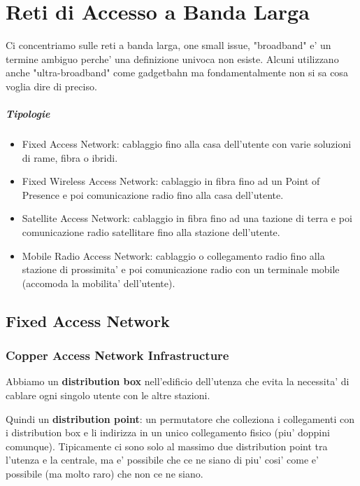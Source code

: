 \chapter{Reti di Accesso a Banda Larga}

Ci concentriamo sulle reti a banda larga, one small issue, "broadband" e' un termine ambiguo perche' una definizione univoca non esiste.
Alcuni utilizzano anche "ultra-broadband" come gadgetbahn ma fondamentalmente non si sa cosa voglia dire di preciso.


\paragraph{Tipologie}

\begin{itemize}
  \item Fixed Access Network: cablaggio fino alla casa dell'utente con varie soluzioni di rame, fibra o ibridi.
  \item Fixed Wireless Access Network: cablaggio in fibra fino ad un Point of Presence e poi comunicazione radio fino alla casa dell'utente.
  \item Satellite Access Network: cablaggio in fibra fino ad una tazione di terra e poi comunicazione radio satellitare fino alla stazione dell'utente.
  \item Mobile Radio Access Network: cablaggio o collegamento radio fino alla stazione di prossimita' e poi comunicazione radio con un terminale mobile (accomoda la mobilita' dell'utente).
\end{itemize}

\section{Fixed Access Network}

\subsection{Copper Access Network Infrastructure}

Abbiamo un \textbf{distribution box} nell'edificio dell'utenza che evita la necessita' di cablare ogni singolo utente con le altre stazioni.

Quindi un \textbf{distribution point}: un permutatore che colleziona i collegamenti con i distribution box e li indirizza in un unico collegamento fisico (piu' doppini comunque).
Tipicamente ci sono solo al massimo due distribution point tra l'utenza e la centrale, ma e' possibile che ce ne siano di piu' cosi' come e' possibile (ma molto raro) che non ce ne siano.

